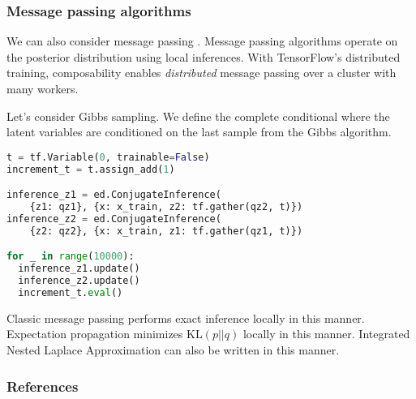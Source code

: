 \subsubsection{Message passing algorithms}

We can also consider message passing \citep{koller2009probabilistic}.
Message passing algorithms operate on the posterior distribution using
local inferences. With TensorFlow's distributed training,
composability enables \emph{distributed} message passing over a
cluster with many workers.

Let's consider Gibbs sampling. We define the complete conditional
where the latent variables are conditioned on the last sample from the
Gibbs algorithm.
\begin{lstlisting}[language=Python]
t = tf.Variable(0, trainable=False)
increment_t = t.assign_add(1)

inference_z1 = ed.ConjugateInference(
    {z1: qz1}, {x: x_train, z2: tf.gather(qz2, t)})
inference_z2 = ed.ConjugateInference(
    {z2: qz2}, {x: x_train, z1: tf.gather(qz1, t)})

for _ in range(10000):
  inference_z1.update()
  inference_z2.update()
  increment_t.eval()
\end{lstlisting}

Classic message passing performs exact inference locally in this
manner. Expectation propagation \citep{minka2001expectation} minimizes
$\text{KL}(p || q)$ locally in this manner. Integrated Nested Laplace
Approximation \citep{rue2009approximate} can also be written in this
manner.

\subsubsection{References}\label{references}

